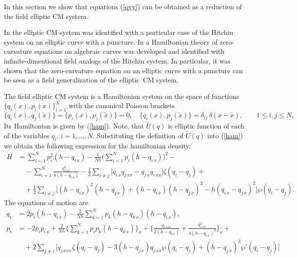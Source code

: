 \documentclass[a4paper,11pt]{article}
\newcommand{\wt}{\widetilde}
\theoremstyle{plain}
\theoremstyle{remark}
\begin{document}
In this section we show that equations (\ref{qyy}) can be obtained
as a reduction of the field elliptic CM system.

In \cite{n} the elliptic CM system was identified with a particular case
of the Hitchin system on an elliptic curve with a puncture. In \cite{krvb}
a Hamiltonian theory of zero-curvature equations on algebraic curves was
developed and identified with infinite-dimentional field analogs of the
Hitchin system.
In particular, it was shown that the zero-curvature equation on an
elliptic curve with a puncture can be seen as a field generalization
of the elliptic~CM system.

The field elliptic CM system is a Hamiltonian system on the space of
functions $\{q_i(x),p_i(x)\}_{i=1}^N$ with the canonical Poisson brackets
$$
\bigl\{ q_i(x),q_j(\tilde x)\bigr\}=\bigl\{ p_i(x),p_j(\tilde
x)\bigr\}=0, \quad \bigl\{ q_i(x),p_j(\tilde x)
\bigr\}=\delta_{ij}\,\delta (x-\tilde x) , \qquad 1\le i,j\le N ,
$$
Its Hamiltonian is given by (\ref{ham}). Note, that $\wt U(q)$ is elliptic
function of each of the variables $q_i$, $i=1,\dots,N$.
Substituting the definition of $\wt U(q)$ into (\ref{ham}) we obtain
the following expression for the hamiltonian density:
$$
\begin{aligned}
H &= \sum_{i=1}^N p_i^2(h-q_{i\,x})-
 \frac{1}{N h} \biggl( \sum_{i=1}^N p_i(h-q_{i\,x}) \biggr)^{\!2} -{}\\
{}&\quad{}-\sum_{i=1}^N \frac{q^2_{i\,xx}}{4(h-q_{i\,x})}
 -\frac{1}{2} \sum_{i\neq j}
 \bigl[ q_{i\,x}q_{j\,xx}-q_{j\,x}q_{i\,xx} \bigr] \zeta(q_i-q_j)+{}\\
{}&\quad{}+\frac{1}{2}\sum_{i\neq j}
 \bigl[(h-q_{i\,x})^2(h-q_{j\,x})+(h-q_{i\,x})(h-q_{j\,x})^2
 -h(q_{i\,x}-q_{j\,x})^2 \bigr]\wp(q_i-q_j) .
\end{aligned}
$$
The equations of motion are
\begin{equation}\label{sys}
\begin{aligned}
\dot q_i &=2p_i(h-q_{i\,x})-\frac{2}{Nh}
 \sum_{k=1}^N p_k (h-q_{k\,x})(h-q_{i\,x}) , \\
\dot p_i &=-2p_ip_{i\,x}+
 \frac{2}{Nh}\biggl\{\sum_{k=1}^N p_i p_k(h-q_{k\,x})\biggr\}_{\!x}+
 \biggl\{
 \frac{q_{i\,xxx}}{2(h-q_{i\,x})}+\frac{q_{i\,xx}^2}{4(h-q_{i\,x})^2}
 \biggr\}_{\!x}+{}\\
{}&\quad{}+2\sum_{j\ne i}\bigl[
 q_{j\,xxx}\zeta(q_i-q_j)-3(h-q_{j\,x})q_{j\,xx}\wp(q_i-q_j)+
 (h-q_{j\,x})^3\wp'(q_i-q_j) \bigr]
\end{aligned}
\end{equation}
\end{document}
